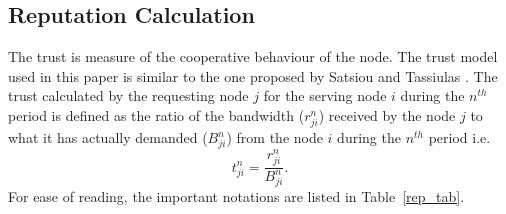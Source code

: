 \documentclass[journal]{IEEEtran}
\begin{document}
\subsection{Reputation Calculation}
The trust is measure of the cooperative behaviour of the node. The trust model used in this paper is similar to the one proposed by Satsiou and Tassiulas \cite{Satsiou}. The trust calculated by the requesting node $j$ for the serving node $i$  during the $n^{th}$ period is defined as the ratio of the bandwidth ($r_{ji}^n$) received by the node $j$ to what it has actually demanded ($B_{ji}^n$) from the node $i$  during the $n^{th}$ period i.e.
\begin{equation}
	t_{ji}^n=\frac{r_{ji}^n}{B_{ji}^n}.
\end{equation} 
For ease of reading, the important notations are listed in Table~\ref{rep_tab}.
\end{document}
